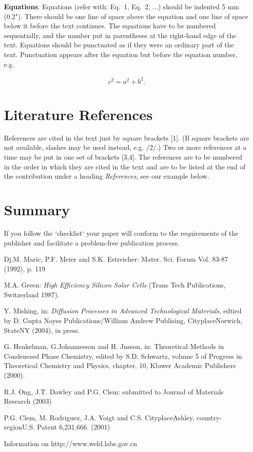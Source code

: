 \documentclass{ttp}
\begin{document}
\vspace{6pt}
\textbf{Equations}.  Equations (refer with: Eq.~1, Eq.~2, ...) should be indented 5 mm (0.2").
There should be one line of space above the equation and one line of space below it before the text continues.
The equations have to be numbered sequentially, and the number put in parentheses at the right-hand edge of the
text. Equations should be punctuated as if they were an ordinary part of the text. Punctuation appears after the
equation but before the equation number, e.g.

\begin{eqnarray}
c^2 = a^2 + b^2.
\end{eqnarray}

\section{Literature References}

\noindent References are cited in the text just by square brackets [1].
 (If square brackets are not available, slashes may be used instead, e.g. /2/.)
Two or more references at a time may be put in one set of brackets [3,4]. The
references are to be numbered in the order in which they are cited in the text and
are to be listed at the end of the contribution under a heading \textit{References},
see our example below.

\section{Summary}
\noindent If you follow the `checklist` your paper will conform to the requirements
 of the publisher and facilitate a problem-free publication process.

\begin{thebibliography}{99}

 Dj.M. Maric, P.F. Meier and S.K. Estreicher: Mater. Sci. Forum Vol. 83-87 (1992), p. 119

 M.A. Green: \textit{High Efficiency Silicon Solar Cells }(Trans Tech Publications, Switzerland 1987).

 Y. Mishing, in: \textit{Diffusion Processes in Advanced Technological Materials},
edtied by D. Gupta Noyes Publications/William Andrew Publising, CityplaceNorwich, StateNY (2004), in press.

 G. Henkelman, G.Johannesson and H. Jnsson, in: Theoretical Methods in Condencsed
Phase Chemistry, edited by S.D. Schwartz, volume 5 of Progress in Theoretical Chemistry and Physics, chapter,
10, Kluwer Academic Publishers (2000).

 R.J. Ong, J.T. Dawley and P.G. Clem: submitted to Journal of Materials Research (2003)

 P.G. Clem, M. Rodriguez, J.A. Voigt and C.S. CityplaceAshley, country-regionU.S. Patent 6,231,666. (2001)

  Information on http://www.weld.labs.gov.cn

\end{thebibliography}
\end{document}
